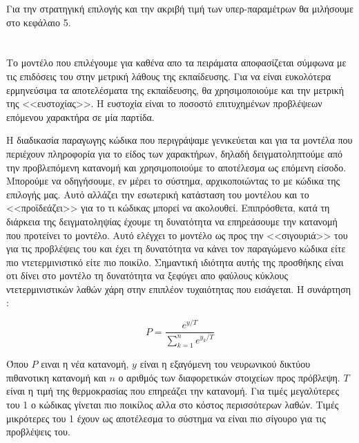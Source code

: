 Για την στρατηγική επιλογής και την ακριβή τιμή των υπερ-παραμέτρων θα μιλήσουμε στο κεφάλαιο 5.

\section{}

Το μοντέλο που επιλέγουμε για καθένα απο τα πειράματα αποφασίζεται σύμφωνα με τις επιδόσεις του στην μετρική λάθους της εκπαίδευσης.
Για να είναι ευκολότερα ερμηνεύσιμα τα αποτελέσματα της εκπαίδευσης, θα χρησιμοποιούμε και την μετρική της <<ευστοχίας>>.
Η ευστοχία είναι το ποσοστό επιτυχημένων προβλέψεων επόμενου χαρακτήρα σε μία παρτίδα.

Η διαδικασία παραγωγης κώδικα που περιγράψαμε γενικεύεται και για τα μοντέλα που περιέχουν πληροφορία για το είδος των χαρακτήρων, δηλαδή δειγματοληπτούμε από την προβλεπόμενη κατανομή και χρησιμοποιούμε το αποτέλεσμα ως επόμενη είσοδο.
Μπορούμε να οδηγήσουμε, εν μέρει το σύστημα, αρχικοποιώντας το με κώδικα της επιλογής μας. Αυτό αλλάζει την εσωτερική κατάσταση του μοντέλου και το <<προϊδεάζει>> για το τι κώδικας μπορεί να ακολουθεί. 
Επιπρόσθετα, κατά τη διάρκεια της δειγματοληψίας έχουμε τη δυνατότητα να επηρεάσουμε την κατανομή που προτείνει το μοντέλο.
Αυτό ελέγχει το μοντέλο ως προς την <<σιγουριά>> του για τις προβλέψεις του και έχει τη δυνατότητα να κάνει τον παραγώμενο κώδικα είτε πιο ντετερμινιστικό είτε πιο ποικίλο.
Σημαντική ιδιότητα αυτής της προσθήκης είναι οτι δίνει στο μοντέλο τη δυνατότητα να ξεφύγει απο φαύλους κύκλους ντετερμινιστικών λαθών χάρη στην επιπλέον τυχαιότητας που εισάγεται.
Η συνάρτηση : 

\begin{equation}
P = \frac{e^{y/T}}{\sum_{k = 1}^{n} e^{y_k/T}}
\end{equation}

Όπου $P$ ειναι η νέα κατανομή, $y$ είναι η εξαγόμενη του νευρωνικού δικτύου πιθανοτικη κατανομή και $n$ ο αριθμός των διαφορετικών στοιχείων προς πρόβλεψη. $T$ είναι η τιμή της θερμοκρασίας που επηρεάζει την  κατανομή.
Για τιμές μεγαλύτερες του 1 ο κώδικας γίνεται πιο ποικίλος αλλα στο κόστος περισσότερων λαθών.
Τιμές μικρότερες του 1 έχουν ως αποτέλεσμα το σύστημα να είναι πιο σίγουρο για τις προβλέψεις του.



